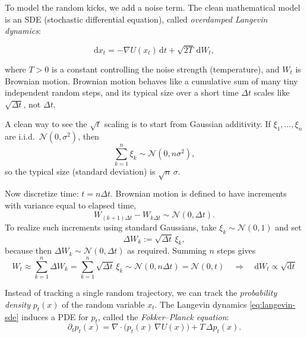 \documentclass[../main]{subfiles}
\begin{document}
To model the random kicks, we add a noise term. The clean mathematical model is an SDE (stochastic
differential equation), called \emph{overdamped Langevin dynamics}:
\begin{theorem}
\begin{equation}\label{eq:langevin-sde}
    \mathrm d x_t
    =
    -\nabla U(x_t)\,\mathrm dt
    +
    \sqrt{2T}\,\mathrm d W_t,
\end{equation}
\end{theorem}
where $T>0$ is a constant controlling the noise strength (temperature), and $W_t$ is Brownian motion.
Brownian motion behaves like a cumulative sum of many tiny independent random steps, and its typical
size over a short time $\Delta t$ scales like $\sqrt{\Delta t}$, not $\Delta t$.
\begin{remark}
    A clean way to see the $\sqrt{t}$ scaling is to start from Gaussian
    additivity. If $\xi_1,\dots,\xi_n$ are i.i.d.\ $\mathcal N(0,\sigma^2)$, then
    \begin{equation}
        \sum_{k=1}^n \xi_k \sim \mathcal N(0,n\sigma^2),
    \end{equation}
    so the typical size (standard deviation) is $\sqrt{n}\,\sigma$.

    Now discretize time: $t=n\Delta t$. Brownian motion is defined to have
    increments with variance equal to elapsed time,
    \begin{equation}
        W_{(k+1)\Delta t}-W_{k\Delta t}\sim \mathcal N(0,\Delta t).
    \end{equation}
    To realize such increments using standard Gaussians, take $\xi_k\sim\mathcal N(0,1)$ and set
    \begin{equation}
        \Delta W_k := \sqrt{\Delta t}\,\xi_k,
    \end{equation}
    because then $\Delta W_k\sim\mathcal N(0,\Delta t)$ as required. Summing $n$ steps gives
    \begin{equation}
        W_t \approx \sum_{k=1}^n \Delta W_k
        = \sum_{k=1}^n \sqrt{\Delta t}\,\xi_k
        \sim \mathcal N(0,n\Delta t)
        = \mathcal N(0,t)\quad\Rightarrow\quad \mathrm dW_t\propto \sqrt{\mathrm d t}
    \end{equation}
\end{remark}

Instead of tracking a single random trajectory, we can track the \emph{probability density}
$p_t(x)$ of the random variable $x_t$. The Langevin dynamics \eqref{eq:langevin-sde} induces a PDE
for $p_t$, called the \emph{Fokker--Planck equation}:
\begin{equation}\label{eq:fokker-planck}
    \partial_t p_t(x)
    =
    \nabla\cdot\!\bigl(p_t(x)\,\nabla U(x)\bigr)
    +
    T\,\Delta p_t(x).
\end{equation}
\end{document}
